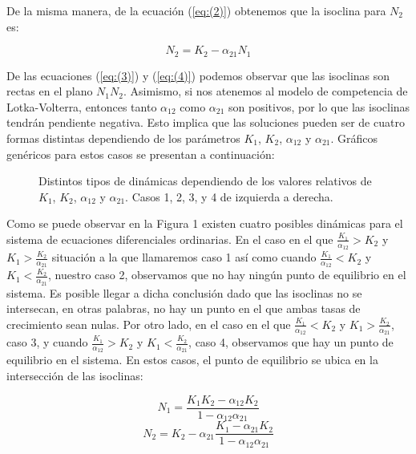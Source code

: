 \documentclass{article}
\begin{document}
De la misma manera, de la ecuación (\ref{eq:(2)}) obtenemos que la isoclina para \(N_2\) es:

\begin{equation}
N_2 = K_2 - \alpha_{21}N_1  \label{eq:(4)}
\end{equation}

De las ecuaciones (\ref{eq:(3)}) y (\ref{eq:(4)}) podemos observar que las isoclinas son rectas en el plano \(N_1N_2\). Asimismo, si nos atenemos al modelo de competencia de Lotka-Volterra,
entonces tanto \(\alpha_{12}\) como \(\alpha_{21}\) son positivos, por lo que las isoclinas tendrán pendiente negativa. Esto implica que las soluciones pueden ser de cuatro formas distintas
dependiendo de los parámetros \(K_1\), \(K_2\), \(\alpha_{12}\) y \(\alpha_{21}\). Gráficos genéricos para estos casos se presentan a continuación:
\begin{figure}
    \centering
        \caption{Distintos tipos de dinámicas dependiendo de los valores relativos de \(K_1\), \(K_2\), \(\alpha_12\) y \(\alpha_21\). Casos 1, 2, 3, y 4 de izquierda a derecha.}
    \label{fig:tipos_de_isoclinas}
\end{figure}

Como se puede observar en la Figura 1 existen cuatro posibles dinámicas para el sistema de ecuaciones diferenciales ordinarias.
 En el caso en el que \(\frac {K_1}{\alpha_12} > K_2\) y \(K_1 > \frac {K_2}{\alpha_{21}}\) situación a la que llamaremos caso 1 así como cuando 
\(\frac {K_1}{\alpha_12} < K_2\) y \(K_1 < \frac {K_2}{\alpha_{21}}\), nuestro caso 2, observamos que no hay ningún punto de equilibrio en el sistema. Es posible
llegar a dicha conclusión dado que las isoclinas no se intersecan, en otras palabras, no hay un punto en el que ambas tasas de crecimiento sean nulas. Por otro lado, 
en el caso en el que \(\frac {K_1}{\alpha_12} < K_2\) y \(K_1 > \frac {K_2}{\alpha_{21}}\), caso 3, y cuando \(\frac {K_1}{\alpha_12} > K_2\) y 
\(K_1 < \frac {K_2}{\alpha_{21}}\), caso 4, observamos que hay un punto de equilibrio en el sistema. En estos casos, el punto de equilibrio se ubica en la intersección
de las isoclinas:

\begin{equation}
N_1 = \frac {K_1K_2 - \alpha_{12}K_2} {1 - \alpha_{12}\alpha_{21}} \label{eq:(5)}
\end{equation}
\begin{equation}
N_2 = K_2 - \alpha_{21}\frac {K_1 - \alpha_{21}K_2} {1 - \alpha_{12}\alpha_{21}} \label{eq:(6)}
\end{equation}
\end{document}
